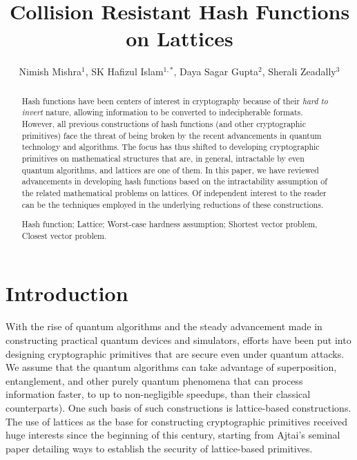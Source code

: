 \documentclass[10pt]{elsarticle}
\begin{document}
\begin{frontmatter}
\title{Collision Resistant Hash Functions on Lattices}

\author{Nimish Mishra$^{1}$, SK Hafizul Islam$^{1,*}$, Daya Sagar Gupta$^{2}$, Sherali Zeadally$^{3}$}
\address{$^{1}$\emph{Department of Computer Science and Engineering, Indian Institute of Information Technology Kalyani, West Bengal~741235, India}\\
$^{2}$\emph{Department of Computer Science and Engineering, Shershah College of Engineering Sasaram, Bihar 821308, India}\\
$^{3}$\emph{College of Communication and Information, University of Kentucky Lexington, KY, USA 40506}\\
{neelam.nimish@gmail.com, hafi786@gmail.com,
dayasagar.ism@gmail.com, szeadally@uky.edu}}


\begin{abstract}
 Hash functions have been centers of interest in cryptography because of their \textit{hard to invert} nature, allowing information to be converted to indecipherable formats. However, all previous constructions of hash functions (and other cryptographic primitives) face the threat of being broken by the recent advancements in quantum technology and algorithms. The focus has thus shifted to developing cryptographic primitives on mathematical structures that are, in general, intractable by even quantum algorithms, and lattices are one of them. In this paper, we have reviewed advancements in developing hash functions based on the intractability assumption of the related mathematical problems on lattices. Of independent interest to the reader can be the techniques employed in the underlying reductions of these constructions.
\begin{keyword}
Hash function; Lattice; Worst-case hardness assumption; Shortest
vector problem, Closest vector problem.
\end{keyword}
\end{abstract}
\end{frontmatter}

\section{Introduction}
With the rise of quantum algorithms and the steady advancement made
in constructing practical quantum devices and simulators, efforts
have been put into designing cryptographic primitives that are
secure even under quantum attacks. We assume that the quantum
algorithms can take advantage of superposition, entanglement, and
other purely quantum phenomena that can process information faster,
to up to non-negligible speedups, than their classical
counterparts). One such basis of such constructions is lattice-based
constructions. The use of lattices as the base for constructing
cryptographic primitives received huge interests since the beginning
of this century, starting from Ajtai's seminal paper
\cite{CRHF_Ajtai1996} detailing ways to establish the security of
lattice-based primitives.
\end{document}
